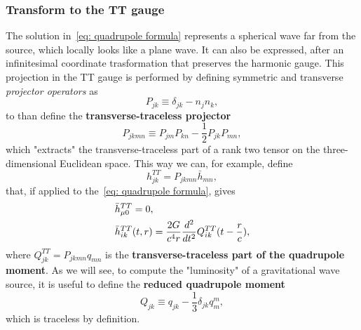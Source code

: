 \subsubsection{Transform to the TT gauge}
The solution in~\eqref{eq: quadrupole formula} represents a spherical wave far from the source, which locally looks like a plane wave.
It can also be expressed, after an infinitesimal coordinate trasformation that preserves the harmonic gauge.
This projection in the TT gauge is performed by defining symmetric and transverse \textit{projector operators} as
\[
    P_{jk}\equiv \delta_{jk} - n_jn_k,
\]
to than define the \textbf{transverse-traceless projector} 
\begin{equation}
    P_{jkmn}\equiv P_{jm}P_{kn}-\frac{1}{2}P_{jk}P_{mn},
    \label{eq: transverse-traceless projector}
\end{equation}
which "extracts" the transverse-traceless part of a rank two tensor on the three-dimensional Euclidean space.
This way we can, for example, define
\[
    h_{jk}^{TT} = P_{jkmn}\bar{h}_{mn},
\]
that, if applied to the~\eqref{eq: quadrupole formula}, gives
\begin{align}
   &\bar{h}^{TT}_{\mu 0} =0,\notag\\
   &\bar{h}^{TT}_{ik}(t,r) = \frac{2G}{c^4r}\frac{d^2}{dt^2}Q^{TT}_{ik}(t-\frac{r}{c}),
   \label{eq: TT part of quadrupole moment}
\end{align}
where $Q_{jk}^{TT} = P_{jkmn}q_{mn}$ is the \textbf{transverse-traceless part of the quadrupole moment}.
As we will see, to compute the "luminosity" of a gravitational wave source, it is useful to define the \textbf{reduced quadrupole moment}
\begin{equation}
    Q_{jk} \equiv q_{jk} - \frac{1}{3}\delta_{jk}q_m^m, 
    \label{eq: reduced quadrupole moment}
\end{equation}
which is traceless by definition.

